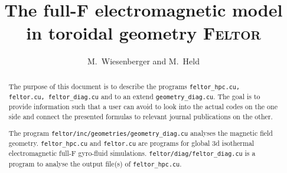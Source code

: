 





\title{
The full-F electromagnetic model in toroidal geometry \textsc{Feltor}}
\author{ M.~Wiesenberger and M.~Held}
\maketitle

\begin{abstract}
The purpose of this document is to describe the programs
\texttt{feltor\_hpc.cu, feltor.cu, feltor\_diag.cu} and to an extend
\texttt{geometry\_diag.cu}. The goal is to provide
information such that a user can avoid to look
into the actual codes on the one side and connect
the presented formulas to relevant journal publications on the other.

The program \texttt{feltor/inc/geometries/geometry\_diag.cu}
analyses the magnetic field geometry.
\texttt{feltor\_hpc.cu} and \texttt{feltor.cu} are programs for global 3d isothermal electromagnetic full-F gyro-fluid simulations.
\texttt{feltor/diag/feltor\_diag.cu} is a program to analyse the output
file(s) of \texttt{feltor\_hpc.cu}.

\end{abstract}

